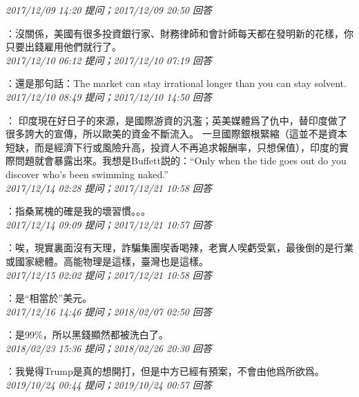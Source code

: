 \documentclass[twocolumn]{ctexart}
\begin{document}
\textit{\hfill\noindent\small 2017/12/09 14:20 提问；2017/12/09 20:50 回答}

：沒關係，美國有很多投資銀行家、財務律師和會計師每天都在發明新的花樣，你只要出錢雇用他們就行了。
\\

\textit{\hfill\noindent\small 2017/12/10 06:12 提问；2017/12/10 07:19 回答}

：還是那句話：The market can stay irrational longer than you can stay solvent.
\\

\textit{\hfill\noindent\small 2017/12/10 08:49 提问；2017/12/10 14:50 回答}

：
印度現在好日子的來源，是國際游資的汎濫；英美媒體爲了仇中，替印度做了很多誇大的宣傳，所以歐美的資金不斷流入。
一旦國際銀根緊縮（這並不是資本短缺，而是經濟下行或風險升高，投資人不再追求報酬率，只想保值），印度的實際問題就會暴露出來。我想是Buffett説的：“Only when the tide goes out do you discover who's been swimming naked.”
\\

\textit{\hfill\noindent\small 2017/12/14 02:28 提问；2017/12/21 10:58 回答}

：指桑駡槐的確是我的壞習慣。。。
\\

\textit{\hfill\noindent\small 2017/12/14 09:09 提问；2017/12/21 10:57 回答}

：唉，現實裏面沒有天理，詐騙集團喫香喝辣，老實人喫虧受氣，最後倒的是行業或國家總體。高能物理是這樣，臺灣也是這樣。
\\

\textit{\hfill\noindent\small 2017/12/15 02:02 提问；2017/12/21 10:58 回答}

：是“相當於”美元。
\\

\textit{\hfill\noindent\small 2017/12/16 14:46 提问；2018/02/07 02:50 回答}

：是99\%，所以黑錢顯然都被洗白了。
\\

\textit{\hfill\noindent\small 2018/02/23 15:36 提问；2018/02/26 20:30 回答}

：我覺得Trump是真的想開打，但是中方已經有預案，不會由他爲所欲爲。
\\

\textit{\hfill\noindent\small 2019/10/24 00:44 提问；2019/10/24 00:57 回答}
\end{document}
